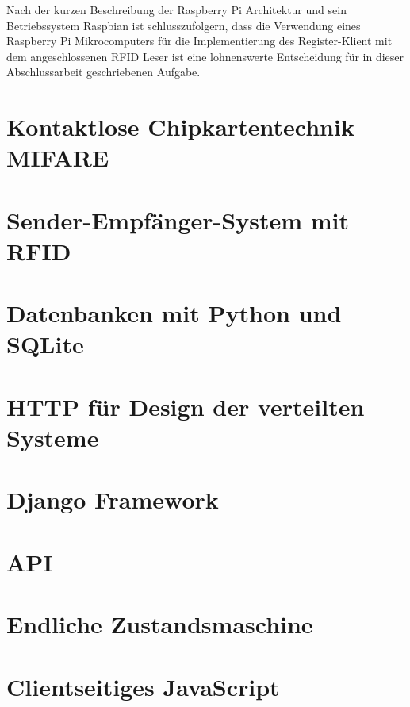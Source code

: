Nach der kurzen Beschreibung der Raspberry Pi Architektur und sein Betriebssystem Raspbian ist schlusszufolgern, dass die Verwendung eines Raspberry Pi Mikrocomputers für die Implementierung des Register-Klient mit dem angeschlossenen RFID Leser ist eine lohnenswerte Entscheidung für in dieser Abschlussarbeit geschriebenen Aufgabe.  


\section{Kontaktlose Chipkartentechnik MIFARE}
\label{sec:theorie:mifare}

\section{Sender-Empfänger-System mit RFID}
\label{sec:theorie:rfid}

\section{Datenbanken mit Python und SQLite}
\label{sec:theorie:db}

\section{HTTP für Design der verteilten Systeme}
\label{sec:theorie:http}

\section{Django Framework}
\label{sec:theorie:about_django}

\section{API}
\label{sec:theorie:api}

\section{Endliche Zustandsmaschine}
\label{sec:theorie:fsm}

\section{Clientseitiges JavaScript}
\label{sec:theorie:js}




